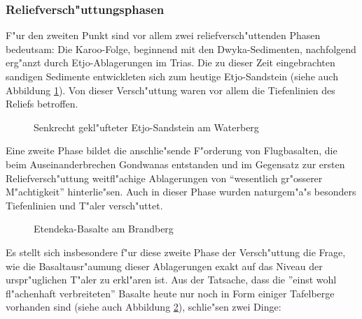 \documentclass[titlepage,a4paper]{scrartcl}
\begin{document}
\subsubsection{Reliefversch"uttungsphasen}

F"ur den zweiten Punkt sind vor allem zwei reliefversch"uttenden Phasen bedeutsam:  Die Karoo-Folge, beginnend mit den Dwyka-Sedimenten, nachfolgend erg"anzt durch Etjo-Ablagerungen im Trias. Die zu dieser Zeit eingebrachten sandigen Sedimente entwickleten sich zum heutige Etjo-Sandstein (siehe auch Abbildung \ref{etjo}). Von dieser Versch"uttung waren vor allem die Tiefenlinien des Reliefs betroffen.

\begin{figure}
\begin{center}
\end{center}
\caption[Waterberg: Etjo-Sandstein]{Senkrecht gekl"ufteter Etjo-Sandstein am Waterberg }
\label{etjo}
\end{figure}

Eine zweite Phase bildet die anschlie"sende F"orderung von Flugbasalten, die beim Auseinanderbrechen Gondwanas entstanden und im Gegensatz zur ersten Reliefversch"uttung weitfl"achige Ablagerungen von ``wesentlich gr"osserer M"achtigkeit'' \citep{HueserEtAl2003} hinterlie"sen. Auch in dieser Phase wurden naturgem"a"s besonders Tiefenlinien und T"aler versch"uttet.

\begin{figure}
\begin{center}
\end{center}
\caption[Etendeka-Basalte am Brandberg]{Etendeka-Basalte am Brandberg }
\label{etendeka}
\end{figure}

Es stellt sich insbesondere f"ur diese zweite Phase der Versch"uttung die Frage, wie die Basaltausr"aumung dieser Ablagerungen exakt auf das Niveau der urspr"uglichen T"aler zu erkl"aren ist. Aus der Tatsache, dass die ''einst wohl fl"achenhaft verbreiteten'' \citep{HueserEtAl2003} Basalte heute nur noch in Form einiger Tafelberge vorhanden sind (siehe auch Abbildung \ref{etendeka}), schlie"sen \cite{HueserEtAl2003} zwei Dinge:
\end{document}
